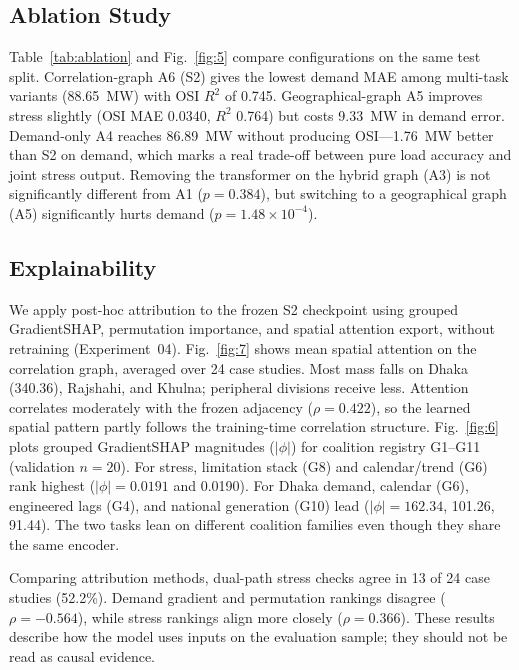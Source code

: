 \subsection{Ablation Study}

Table~\ref{tab:ablation} and Fig.~\ref{fig:5} compare configurations on the same test split. Correlation-graph A6 (S2) gives the lowest demand MAE among multi-task variants (88.65~MW) with OSI $R^2$ of 0.745. Geographical-graph A5 improves stress slightly (OSI MAE 0.0340, $R^2$ 0.764) but costs 9.33~MW in demand error. Demand-only A4 reaches 86.89~MW without producing OSI---1.76~MW better than S2 on demand, which marks a real trade-off between pure load accuracy and joint stress output. Removing the transformer on the hybrid graph (A3) is not significantly different from A1 ($p{=}0.384$), but switching to a geographical graph (A5) significantly hurts demand ($p{=}1.48{\times}10^{-4}$).




\subsection{Explainability}

We apply post-hoc attribution \cite{Lundberg2017SHAP,Sundararajan2017IntegratedGradients} to the frozen S2 checkpoint using grouped GradientSHAP, permutation importance, and spatial attention export, without retraining (Experiment~04). Fig.~\ref{fig:7} shows mean spatial attention on the correlation graph, averaged over 24 case studies. Most mass falls on Dhaka (340.36), Rajshahi, and Khulna; peripheral divisions receive less. Attention correlates moderately with the frozen adjacency ($\rho{=}0.422$), so the learned spatial pattern partly follows the training-time correlation structure. Fig.~\ref{fig:6} plots grouped GradientSHAP magnitudes ($|\phi|$) for coalition registry G1--G11 (validation $n{=}20$). For stress, limitation stack (G8) and calendar/trend (G6) rank highest ($|\phi|{=}0.0191$ and 0.0190). For Dhaka demand, calendar (G6), engineered lags (G4), and national generation (G10) lead ($|\phi|{=}162.34$, 101.26, 91.44). The two tasks lean on different coalition families even though they share the same encoder.




Comparing attribution methods, dual-path stress checks agree in 13 of 24 case studies (52.2\%). Demand gradient and permutation rankings disagree ($\rho{=}{-}0.564$), while stress rankings align more closely ($\rho{=}0.366$). These results describe how the model uses inputs on the evaluation sample; they should not be read as causal evidence.
